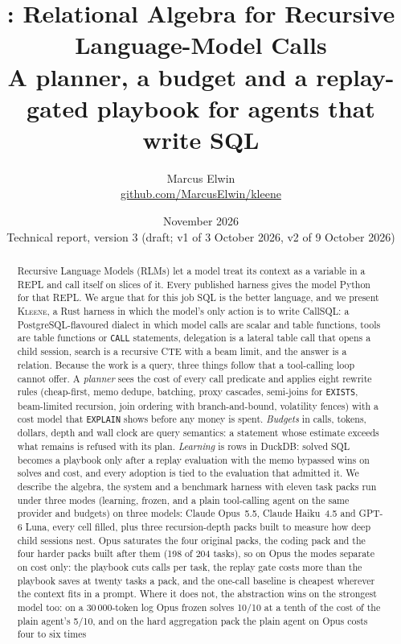 \documentclass[11pt,a4paper]{article}
\title{\textbf{\kleene: Relational Algebra for Recursive Language-Model Calls}\\[4pt]
\large A planner, a budget and a replay-gated playbook for agents that write SQL}
\author{Marcus Elwin\\[2pt]
\normalsize \href{https://github.com/MarcusElwin/kleene}{github.com/MarcusElwin/kleene}}
\date{November 2026 \\[2pt] \small Technical report, version 3 (draft; v1 of 3 October 2026, v2 of 9 October 2026)}
\newcommand{\kleene}{\textsc{Kleene}}
\newcommand{\callsql}{CallSQL}
\newcommand{\code}[1]{\texttt{#1}}
\begin{document}
\maketitle

\begin{abstract}
Recursive Language Models (RLMs) let a model treat its context as a variable in a
REPL and call itself on slices of it. Every published harness gives the model
Python for that REPL. We argue that for this job SQL is the better language, and
we present \kleene, a Rust harness in which the model's only action is to write
\callsql: a PostgreSQL-flavoured dialect in which model calls are scalar and table
functions, tools are table functions or \code{CALL} statements, delegation is a
lateral table call that opens a child session, search is a recursive CTE with a
beam limit, and the answer is a relation. Because the work is a query, three
things follow that a tool-calling loop cannot offer. A \emph{planner} sees the
cost of every call predicate and applies eight rewrite rules (cheap-first,
memo dedupe, batching, proxy cascades, semi-joins for \code{EXISTS}, beam-limited
recursion, join ordering with branch-and-bound, volatility fences) with a cost
model that \code{EXPLAIN} shows before any money is spent. \emph{Budgets} in
calls, tokens, dollars, depth and wall clock are query semantics: a statement
whose estimate exceeds what remains is refused with its plan. \emph{Learning} is
rows in DuckDB: solved SQL becomes a playbook only after a replay evaluation
with the memo bypassed wins on solves and cost, and every adoption is tied to the
evaluation that admitted it. We describe the algebra, the system and a benchmark
harness with eleven task packs run under three modes (learning, frozen, and a
plain tool-calling agent on the same provider and budgets) on three models:
Claude Opus~5.5, Claude Haiku~4.5 and GPT-6 Luna, every cell filled, plus
three recursion-depth packs built to measure how deep child sessions nest.
Opus saturates the four original packs, the coding pack and the four harder
packs built after them (198 of 204 tasks), so on Opus the modes separate on
cost only: the playbook cuts calls per task, the replay gate costs more than
the playbook saves at twenty tasks a pack, and the one-call baseline is
cheapest wherever the context fits in a prompt. Where it does not, the
abstraction wins on the strongest model too: on a 30\,000-token log Opus
frozen solves 10/10 at a tenth of the cost of the plain agent's 5/10, and on
the hard aggregation pack the plain agent on Opus costs four to six times

\end{abstract}
\end{document}
